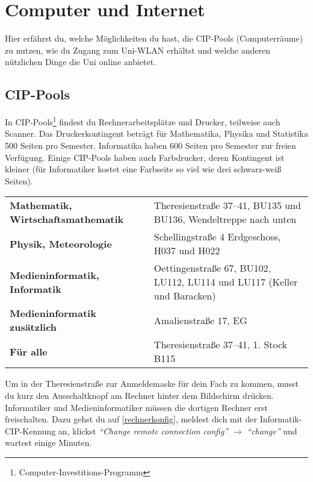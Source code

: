 
%
	
\chapter{Computer und Internet}
Hier erfährst du, welche Möglichkeiten du hast, die CIP-Pools (Computerräume) zu nutzen,  wie du Zugang zum Uni-WLAN erhältst 
und welche anderen nützlichen Dinge die Uni online anbietet.


\section{CIP-Pools}
In CIP-Pools\footnote{Computer-Investitions-Programm} findest du Rechnerarbeitsplätze und Drucker, teilweise auch Scanner. Das Druckerkontingent beträgt für Mathematika, Physika und Statistika 500 Seiten pro Semester. Informatika haben 600 Seiten pro Semester zur freien Verfügung. Einige CIP-Pools haben auch Farbdrucker, deren Kontingent ist kleiner (für Informatiker kostet eine Farbseite so viel wie drei schwarz-weiß Seiten).

\begin{tabularx}{\linewidth}{lX}
\textbf{Mathematik, Wirtschaftsmathematik}
& Theresienstraße 37--41, BU135 und BU136, Wendeltreppe nach unten\\
\textbf{Physik, Meteorologie}
& Schellingstraße 4 Erdgeschoss, H037 und H022\\
\textbf{Medieninformatik, Informatik}
& Oettingenstraße 67, BU102, LU112, LU114 und LU117 (Keller und Baracken)\\
\textbf{Medieninformatik zusätzlich}
& Amalienstraße 17, EG\\
\textbf{Für alle}
& Theresienstraße 37--41, 1. Stock B115 \newline
\end{tabularx}

Um in der Theresienstraße zur Anmeldemaske für dein Fach zu kommen, musst du kurz den Ausschaltknopf am Rechner hinter dem Bildschirm drücken. Informatiker und Medieninformatiker müssen die dortigen Rechner erst freischalten. Dazu gehst du auf \ref{rechnerkonfig}, meldest dich mit der Informatik-CIP-Kennung an, klickst \emph{\enquote{Change remote connection config}} $\rightarrow$ \emph{\enquote{change}} und wartest einige Minuten.

